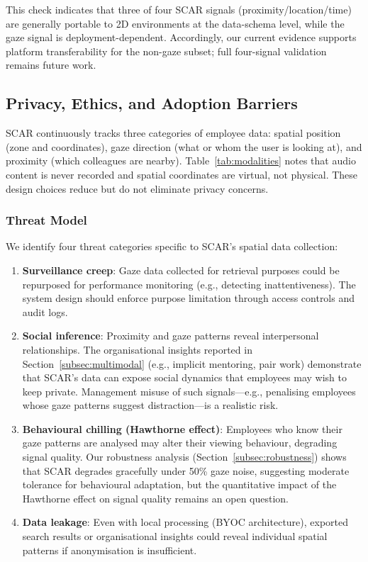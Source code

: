 \documentclass[journal]{IEEEtran}
\begin{document}
This check indicates that three of four SCAR signals
(proximity/location/time) are generally portable to 2D environments at
the data-schema level, while the gaze signal is deployment-dependent.
Accordingly, our current evidence supports platform transferability for
the non-gaze subset; full four-signal validation remains future work.

\subsection{Privacy, Ethics, and Adoption Barriers}
\label{subsec:privacy_ethics}

SCAR continuously tracks three categories of employee data: spatial position (zone and coordinates), gaze direction (what or whom the user is looking at), and proximity (which colleagues are nearby). Table~\ref{tab:modalities} notes that audio content is never recorded and spatial coordinates are virtual, not physical. These design choices reduce but do not eliminate privacy concerns.

\subsubsection{Threat Model}

We identify four threat categories specific to SCAR's spatial data collection:

\begin{enumerate}
\item \textbf{Surveillance creep}: Gaze data collected for retrieval purposes could be repurposed for performance monitoring (e.g., detecting inattentiveness). The system design should enforce purpose limitation through access controls and audit logs.
\item \textbf{Social inference}: Proximity and gaze patterns reveal interpersonal relationships. The organisational insights reported in Section~\ref{subsec:multimodal} (e.g., implicit mentoring, pair work) demonstrate that SCAR's data can expose social dynamics that employees may wish to keep private.  Management misuse of such signals---e.g., penalising employees whose gaze patterns suggest distraction---is a realistic risk.
\item \textbf{Behavioural chilling (Hawthorne effect)}: Employees who know their gaze patterns are analysed may alter their viewing behaviour, degrading signal quality. Our robustness analysis (Section~\ref{subsec:robustness}) shows that SCAR degrades gracefully under 50\% gaze noise, suggesting moderate tolerance for behavioural adaptation, but the quantitative impact of the Hawthorne effect on signal quality remains an open question.
\item \textbf{Data leakage}: Even with local processing (BYOC architecture), exported search results or organisational insights could reveal individual spatial patterns if anonymisation is insufficient.
\end{enumerate}
\end{document}
